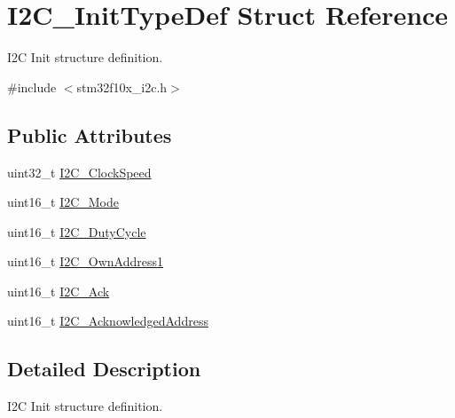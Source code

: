 \hypertarget{structI2C__InitTypeDef}{
\section{I2C\_\-InitTypeDef Struct Reference}
\label{structI2C__InitTypeDef}
}


I2C Init structure definition.  




{\ttfamily \#include $<$stm32f10x\_\-i2c.h$>$}

\subsection*{Public Attributes}
\begin{DoxyCompactItemize}
\item 
uint32\_\-t \hyperlink{structI2C__InitTypeDef_a737c289f4515ae4cb642db0412762169}{I2C\_\-ClockSpeed}
\item 
uint16\_\-t \hyperlink{structI2C__InitTypeDef_ad5cf353c5b6968b3610b70ca593cec52}{I2C\_\-Mode}
\item 
uint16\_\-t \hyperlink{structI2C__InitTypeDef_aff23b28652359513dfd268dee54c3279}{I2C\_\-DutyCycle}
\item 
uint16\_\-t \hyperlink{structI2C__InitTypeDef_a08543cb71b4b2a89ad81a2cefff12b53}{I2C\_\-OwnAddress1}
\item 
uint16\_\-t \hyperlink{structI2C__InitTypeDef_a7bcae26f098e897832e5e42b055f8c98}{I2C\_\-Ack}
\item 
uint16\_\-t \hyperlink{structI2C__InitTypeDef_a300e847972f50b0d25c4f13be5d93d79}{I2C\_\-AcknowledgedAddress}
\end{DoxyCompactItemize}


\subsection{Detailed Description}
I2C Init structure definition. 

